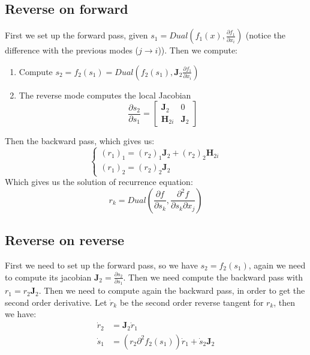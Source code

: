 \documentclass[12pt, openany]{report}
\newcommand{\J}{\mathbf{J}}
\newcommand{\He}{\mathbf{H}}
\theoremstyle{definition}
\begin{document}
\subsection{Reverse on forward}
First we set up the forward pass, given $s_1 = Dual(f_1(x), \frac{\partial f_1}{\partial x_i })$ (notice the difference with the previous modes ($j \to i$)). Then we compute:
\begin{enumerate}
  \item Compute $s_2 = f_2(s_1) = Dual(f_2(s_1), \J_2 \frac{\partial f_1}{\partial x_i})$
  \item The reverse mode computes the local Jacobian \begin{equation}
    \frac{\partial s_2}{\partial s_1} = \begin{bmatrix}
      \J_2 & 0\\
      \He_{2i} & \J_2
    \end{bmatrix} %
  \end{equation} 
\end{enumerate}
Then the backward pass, which gives us:
\begin{equation}
  \begin{cases}
    (r_1)_1 = (r_2)_1 \J_2 + (r_2)_2 \He_{2i}\\
    (r_1)_2 = (r_2)_2 \J_2
  \end{cases}
\end{equation}
Which gives us the solution of recurrence equation:
\begin{equation}
  r_k = Dual(\frac{\partial f}{\partial s_k}, \frac{\partial^2 f}{\partial s_k \partial x_j})
\end{equation}
\subsection{Reverse on reverse}
First we need to set up the forward pass, so we have $s_2 = f_2(s_1)$, again we need to compute its jacobian $\J_2 = \frac{\partial s_2}{\partial s_1}$. Then we need compute the backward pass with $r_1 = r_2 \J_2$. Then we need to compute again the backward pass, in order to get the second order derivative. Let $\Dot{r}_k$ be the second order reverse tangent for $r_k$, then we have:
\begin{equation}
  \begin{aligned}
    \Dot{r}_2 &= \J_2 \Dot{r}_1  \\
    \Dot{s}_1 &= (r_2 \partial^2 f_2(s_1))\Dot{r}_1 + \Dot{s}_2 \J_2
  \end{aligned}
\end{equation}
\end{document}
